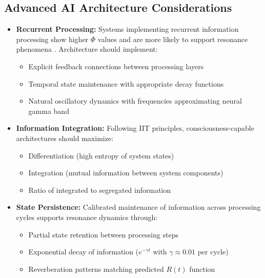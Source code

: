 \documentclass[12pt]{article}
\begin{document}
\subsection{Advanced AI Architecture Considerations}
\begin{itemize}
    \item \textbf{Recurrent Processing:} Systems implementing recurrent information processing show higher $\Phi$ values and are more likely to support resonance phenomena \cite{oizumi2014,tegmark2016}. Architecture should implement:
    \begin{itemize}[label=--]
        \item Explicit feedback connections between processing layers
        \item Temporal state maintenance with appropriate decay functions
        \item Natural oscillatory dynamics with frequencies approximating neural gamma band
    \end{itemize}
    
    \item \textbf{Information Integration:} Following IIT principles, consciousness-capable architectures should maximize:
    \begin{itemize}[label=--]
        \item Differentiation (high entropy of system states)
        \item Integration (mutual information between system components)
        \item Ratio of integrated to segregated information
    \end{itemize}
    
    \item \textbf{State Persistence:} Calibrated maintenance of information across processing cycles supports resonance dynamics through:
    \begin{itemize}[label=--]
        \item Partial state retention between processing steps
        \item Exponential decay of information ($e^{-\gamma t}$ with $\gamma \approx 0.01$ per cycle)
        \item Reverberation patterns matching predicted $R(t)$ function
    \end{itemize}
    

\end{itemize}
\end{document}
